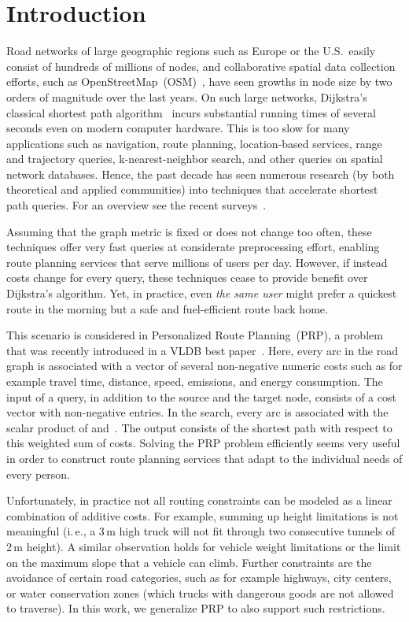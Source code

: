 \documentclass{sig-alternate}
\newcommand{\ie}{i.\,e.\xspace}
\begin{document}
\section{Introduction}

Road networks of large geographic regions such as Europe or the U.S.\
easily consist of hundreds of millions of nodes, and collaborative spatial
data collection efforts, such as OpenStreetMap~(OSM)~\cite{osm},
have seen growths in node size by two orders of magnitude over the
last years. On such large networks, Dijkstra's classical shortest
path algorithm~\cite{d-ntpcg-59} incurs substantial running times
of several seconds even on modern computer hardware. This is too slow
for many applications such as navigation, route planning, location-based
services, range and trajectory queries, k-nearest-neighbor search,
and other queries on spatial network databases. Hence, the past decade
has seen numerous research (by both theoretical and applied
communities) into techniques that accelerate shortest path queries.
For an overview see the recent surveys~\cite{bdgmpsww-rptn-14,s-spqsn-14}. 

Assuming that the graph metric is fixed or does not change too often, these techniques offer very fast queries at  considerate preprocessing effort, enabling route planning services that serve millions of users per day. 
However, if instead costs change for every query, these techniques cease to provide benefit over Dijkstra's algorithm. 
Yet, in practice, even \emph{the same user} might prefer a quickest route in the morning but a safe and fuel-efficient route back home.

This scenario is considered in Personalized Route Planning~(PRP), a problem that was recently
introduced in a VLDB best paper~\cite{fns-opca-14}. Here, every
arc in the road graph is associated with a vector  of several
non-negative numeric costs such as for example travel time, distance, speed,
emissions, and energy consumption. The input of a query, in addition
to the source and the target node, consists of a cost vector  with non-negative
entries. In the search, every arc is associated with the scalar
product of  and~. The output consists of the shortest path 
with respect to this weighted sum of costs. Solving the PRP problem efficiently seems very
useful in order to construct route planning services that adapt
to the individual needs of every person. 

Unfortunately, in practice not all routing constraints can be modeled as a linear combination of additive costs. 
For example, summing up height limitations is not meaningful (\ie, a 3\,m high truck will not fit through two consecutive tunnels of 2\,m height).
A similar observation holds for vehicle weight limitations or the limit on the maximum slope that a vehicle can climb. 
Further constraints are
the avoidance of certain road categories, such as for example highways, city centers, or water conservation zones (which trucks with dangerous goods are not allowed to traverse).
In this work, we generalize PRP to also support such restrictions.
\end{document}
